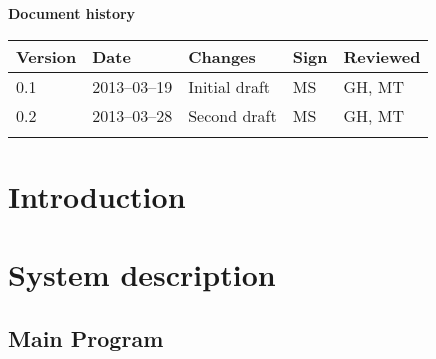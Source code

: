 \documentclass[10pt, a4paper, twoside]{article}
\numberwithin{equation}{subsection}
\numberwithin{figure}{section}
\begin{document}



\newpage
\pagestyle{fancy}
\setcounter{page}{2} %




\newpage
\tableofcontents
\listoffigures



\newpage
\vspace*{5\baselineskip}

\begin{center}
\textbf{\LARGE Document history}

{ \footnotesize 
\begin{tabular}{|p{1cm}|p{2.0cm}|p{5cm}|p{1.5cm}|p{1.5cm}|}
	\hline
	\textbf{Version} & \textbf{Date} & \textbf{Changes} & \textbf{Sign} & \textbf{Reviewed} \\
	
	\hline
	0.1 & 2013--03--19 & Initial draft & MS & GH, MT\\
	
	\hline
	0.2 & 2013--03--28 & Second draft & MS & GH, MT\\
	
	\hline
	 &  &  &  &  \\
	
	\hline
\end{tabular}
}
\end{center}





%
%
\newpage
{}

\newpage
\section{Introduction}


\section{System description}


\newpage
\subsection{Main Program}

\end{document}
